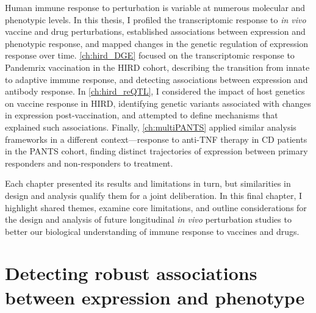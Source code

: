 Human immune response to perturbation is variable at numerous molecular and phenotypic levels.
In this thesis, I profiled the transcriptomic response to \textit{in vivo} vaccine and drug perturbations,
established associations between expression and phenotypic response,
and mapped changes in the genetic regulation of expression response over time.
\cref{ch:hird_DGE} focused on the transcriptomic response to Pandemrix vaccination in the \gls{HIRD} cohort,
describing the transition from innate to adaptive immune response,
and detecting associations between expression and antibody response.
In \cref{ch:hird_reQTL}, 
I considered the impact of host genetics on vaccine response in \gls{HIRD},
identifying genetic variants associated with changes in expression post-vaccination,
and attempted to define mechanisms that explained such associations.
Finally, \cref{ch:multiPANTS} applied similar analysis frameworks in a different context---response to anti-\gls{TNF} therapy in \gls{CD} patients in the \gls{PANTS} cohort,
finding distinct trajectories of expression between primary responders and non-responders to treatment. 

Each chapter presented its results and limitations in turn,
but similarities in design and analysis qualify them for a joint deliberation.
In this final chapter,
I highlight shared themes,
examine core limitations,
and outline considerations for the design and analysis of future longitudinal \textit{in vivo} perturbation studies
to better our biological understanding of immune response to vaccines and drugs.

\section{Detecting robust associations between expression and phenotype}


